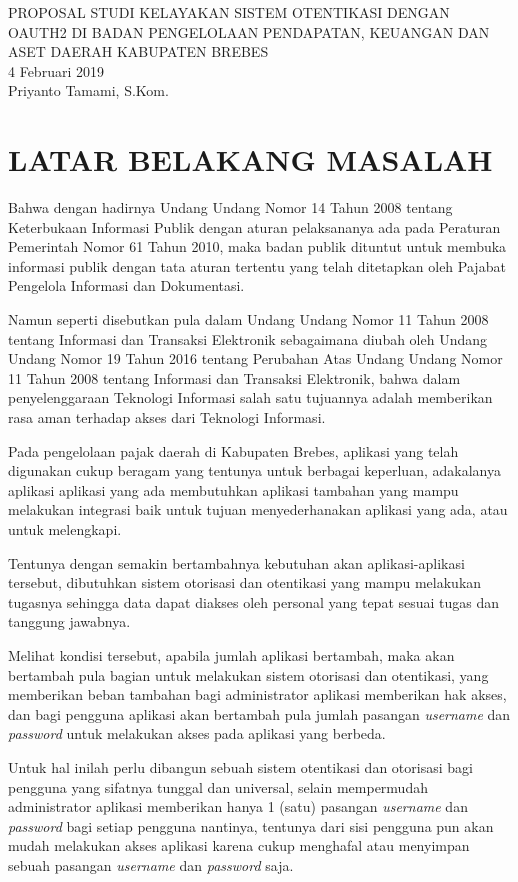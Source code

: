 \documentclass[pdftex,12pt, oneside]{article}
\begin{document}
%
\begin{center}
{\large PROPOSAL STUDI KELAYAKAN SISTEM OTENTIKASI DENGAN OAUTH2 DI BADAN PENGELOLAAN PENDAPATAN, KEUANGAN DAN ASET DAERAH KABUPATEN BREBES}
\\[1cm]
4 Februari 2019\\
Priyanto Tamami, S.Kom.
\end{center}

\section{LATAR BELAKANG MASALAH}

Bahwa dengan hadirnya Undang Undang Nomor 14 Tahun 2008 tentang Keterbukaan Informasi Publik dengan aturan pelaksananya ada pada Peraturan Pemerintah Nomor 61 Tahun 2010, maka badan publik dituntut untuk membuka informasi publik dengan tata aturan tertentu yang telah ditetapkan oleh Pajabat Pengelola Informasi dan Dokumentasi.

Namun seperti disebutkan pula dalam Undang Undang Nomor 11 Tahun 2008 tentang Informasi dan Transaksi Elektronik sebagaimana diubah oleh Undang Undang Nomor 19 Tahun 2016 tentang Perubahan Atas Undang Undang Nomor 11 Tahun 2008 tentang Informasi dan Transaksi Elektronik, bahwa dalam penyelenggaraan Teknologi Informasi salah satu tujuannya adalah memberikan rasa aman terhadap akses dari Teknologi Informasi.

Pada pengelolaan pajak daerah di Kabupaten Brebes, aplikasi yang telah digunakan cukup beragam yang tentunya untuk berbagai keperluan, adakalanya aplikasi aplikasi yang ada membutuhkan aplikasi tambahan yang mampu melakukan integrasi baik untuk tujuan menyederhanakan aplikasi yang ada, atau untuk melengkapi.

Tentunya dengan semakin bertambahnya kebutuhan akan aplikasi-aplikasi tersebut, dibutuhkan sistem otorisasi dan otentikasi yang mampu melakukan tugasnya sehingga data dapat diakses oleh personal yang tepat sesuai tugas dan tanggung jawabnya.

Melihat kondisi tersebut, apabila jumlah aplikasi bertambah, maka akan bertambah pula bagian untuk melakukan sistem otorisasi dan otentikasi, yang memberikan beban tambahan bagi administrator aplikasi memberikan hak akses, dan bagi pengguna aplikasi akan bertambah pula jumlah pasangan \textit{username} dan \textit{password} untuk melakukan akses pada aplikasi yang berbeda.

Untuk hal inilah perlu dibangun sebuah sistem otentikasi dan otorisasi bagi pengguna yang sifatnya tunggal dan universal, selain mempermudah administrator aplikasi memberikan hanya 1 (satu) pasangan \textit{username} dan \textit{password} bagi setiap pengguna nantinya, tentunya dari sisi pengguna pun akan mudah melakukan akses aplikasi karena cukup menghafal atau menyimpan sebuah pasangan \textit{username} dan \textit{password} saja.
\end{document}
